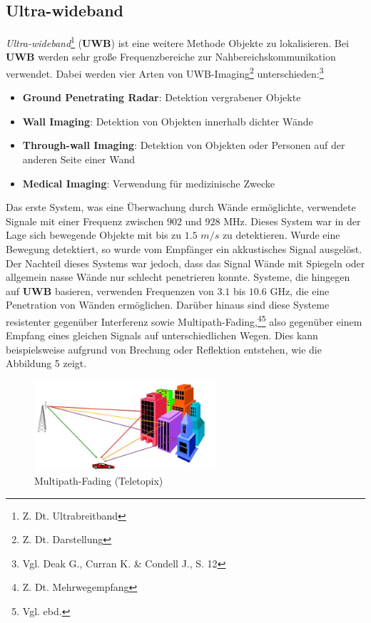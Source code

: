 \subsection{Ultra-wideband}

\textit{Ultra-wideband}\footnote{Z. Dt. Ultrabreitband} (\textbf{UWB}) ist eine weitere Methode Objekte zu lokalisieren. Bei \textbf{UWB} werden sehr große Frequenzbereiche zur Nahbereichskommunikation verwendet. Dabei werden vier Arten von UWB-Imaging\footnote{Z. Dt. Darstellung} unterschieden:\footnote{Vgl. Deak G.,  Curran K. \& Condell J., S. 12}
\begin{itemize}
 	\item \textbf{Ground Penetrating Radar}: Detektion vergrabener Objekte 
 	\item \textbf{Wall Imaging}: Detektion von Objekten innerhalb dichter Wände
 	\item \textbf{Through-wall Imaging}: Detektion von Objekten oder Personen auf der anderen Seite einer Wand
 	\item \textbf{Medical Imaging}: Verwendung für medizinische Zwecke
 \end{itemize} 

Das erste System, was eine Überwachung durch Wände ermöglichte, verwendete Signale mit einer Frequenz zwischen $902$ und $928$ MHz. Dieses System war in der Lage sich bewegende Objekte mit bis zu $1.5$ $m/s$ zu detektieren. Wurde eine Bewegung detektiert, so wurde vom Empfänger ein akkustisches Signal ausgelöst. Der Nachteil dieses Systems war jedoch, dass das Signal Wände mit Spiegeln oder allgemein nasse Wände nur schlecht penetrieren konnte. Systeme, die hingegen auf \textbf{UWB} basieren, verwenden Frequenzen von $3.1$ bis $10.6$ GHz, die eine Penetration von Wänden ermöglichen. Darüber hinaus sind diese Systeme resistenter gegenüber Interferenz sowie Multipath-Fading,\footnote{Z. Dt. Mehrwegempfang}\footnote{Vgl. ebd.} also gegenüber einem Empfang eines gleichen Signals auf unterschiedlichen Wegen. Dies kann beispielsweise aufgrund von Brechung oder Reflektion entstehen, wie die Abbildung 5 zeigt.\\

\begin{figure}[H]
	\centering
	\includegraphics[width=0.6\textwidth]{pictures/multi}
	\caption{Multipath-Fading (Teletopix)}
\end{figure}

